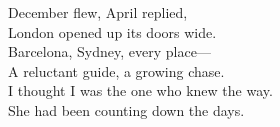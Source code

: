 \begin{lyrics}
December flew, April replied,\\
London opened up its doors wide.\\
Barcelona, Sydney, every place—\\
A reluctant guide, a growing chase.\\
I thought I was the one who knew the way.\\
She had been counting down the days.
\end{lyrics}

